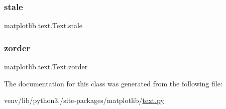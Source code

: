\subsubsection{\texorpdfstring{stale}{stale}}
{\footnotesize\ttfamily matplotlib.\+text.\+Text.\+stale}

\mbox{\label{classmatplotlib_1_1text_1_1Text_a3ec84cd269701cb109b4ec2485f46f30}} 
\subsubsection{\texorpdfstring{zorder}{zorder}}
{\footnotesize\ttfamily matplotlib.\+text.\+Text.\+zorder\hspace{0.3cm}{\ttfamily [static]}}



The documentation for this class was generated from the following file\+:\begin{DoxyCompactItemize}
\item 
venv/lib/python3./site-\/packages/matplotlib/\hyperlink{matplotlib_2text_8py}{text.\+py}\end{DoxyCompactItemize}
